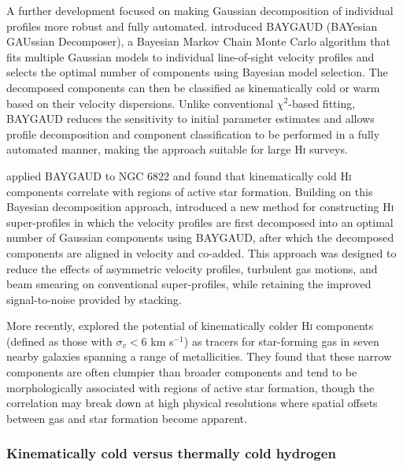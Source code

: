 A further development focused on making Gaussian decomposition of individual profiles more robust and fully automated. \citet{Oh2019} introduced BAYGAUD (BAYesian GAUssian Decomposer), a Bayesian Markov Chain Monte Carlo algorithm that fits multiple Gaussian models to individual line-of-sight velocity profiles and selects the optimal number of components using Bayesian model selection. The decomposed components can then be classified as kinematically cold or warm based on their velocity dispersions. Unlike conventional $\chi^2$-based fitting, BAYGAUD reduces the sensitivity to initial parameter estimates and allows profile decomposition and component classification to be performed in a fully automated manner, making the approach suitable for large \textrm{H\textsc{i}} surveys.\\\indent

\citet{Park2022} applied BAYGAUD to NGC 6822 and found that kinematically cold \textrm{H\textsc{i}} components correlate with regions of active star formation. Building on this Bayesian decomposition approach, \citet{KimOh2022} introduced a new method for constructing \textrm{H\textsc{i}} super-profiles in which the velocity profiles are first decomposed into an optimal number of Gaussian components using BAYGAUD, after which the decomposed components are aligned in velocity and co-added. This approach was designed to reduce the effects of asymmetric velocity profiles, turbulent gas motions, and beam smearing on conventional super-profiles, while retaining the improved signal-to-noise provided by stacking.\\\indent

More recently, \citet{Park2025} explored the potential of kinematically colder \textrm{H\textsc{i}} components (defined as those with $\sigma_v < 6$ km s$^{-1}$) as tracers for star-forming gas in seven nearby galaxies spanning a range of metallicities. They found that these narrow components are often clumpier than broader components and tend to be morphologically associated with regions of active star formation, though the correlation may break down at high physical resolutions where spatial offsets between gas and star formation become apparent.

\subsubsection{Kinematically cold versus thermally cold hydrogen}
\label{subsubsec:kinematic_vs_thermal}

